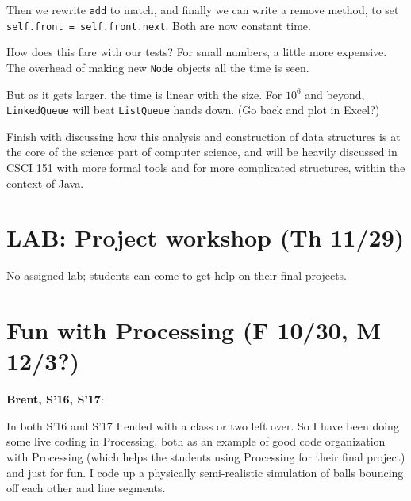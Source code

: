 \documentclass{article}
\newenvironment{reflect}[1]
{
  \noindent
  \begin{lrbox}{\reflectbox}
    \begin{minipage}[t]{\textwidth}
      \textbf{#1}:
}{
    \end{minipage}
  \end{lrbox}
  \fbox{\usebox{\reflectbox}}
}
\begin{document}
Then we rewrite \verb|add| to match, and finally we can write a remove
method, to set \verb|self.front = self.front.next|.  Both are now
constant time.

How does this fare with our tests? For small numbers, a little more
expensive. The overhead of making new \verb|Node| objects all the time
is seen.

But as it gets larger, the time is linear with the size. For $10^6$
and beyond, \verb|LinkedQueue| will beat \verb|ListQueue| hands
down. (Go back and plot in Excel?)

Finish with discussing how this analysis and construction of data
structures is at the core of the science part of computer science, and will
be heavily discussed in CSCI 151 with more formal tools and for more
complicated structures, within the context of Java.

\newpage
\section{LAB: Project workshop (Th 11/29)}

No assigned lab; students can come to get help on their final
projects.

\newpage
\section{Fun with Processing (F 10/30, M 12/3?)}

\begin{reflect}{Brent, S'16, S'17}
  In both S'16 and S'17 I ended with a class or two left over.  So I
  have been doing some live coding in Processing, both as an example
  of good code organization with Processing (which helps the students
  using Processing for their final project) and just for fun.  I code
  up a physically semi-realistic simulation of balls bouncing off each
  other and line segments.
\end{reflect}
\end{document}
